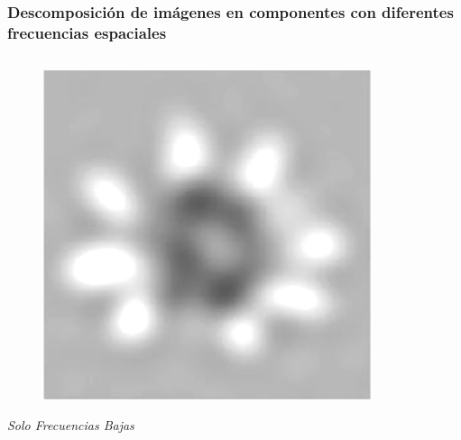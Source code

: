 \documentclass[
11pt, %
%
aspectratio=169, %
]{beamer}
\begin{document}
     
    
     
     \begin{frame}
     	\frametitle{Descomposici\'on de im\'agenes en componentes con diferentes frecuencias espaciales}   
     	
     	   	
     	\begin{columns}[c] %
     	\begin{column}{0.3\textwidth} %
     		\centering
     		\begin{figure}     				
     			\includegraphics[scale=0.45]{Graphics/low_sf}
     		\end{figure}
     		\textit{Solo Frecuencias Bajas}
     		
     	\end{column}
     	

\end{columns}
\end{frame}
\end{document}
